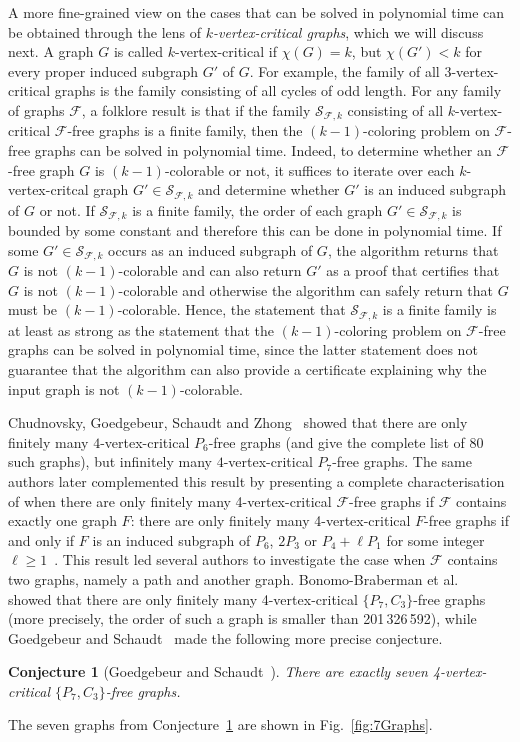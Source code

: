 \documentclass[11pt,a4paper]{article}
\newtheorem{conjecture}[theorem]{Conjecture}
\theoremstyle{definition}
\begin{document}
A more fine-grained view on the cases that can be solved in polynomial time can be obtained through the lens of \textit{$k$-vertex-critical graphs}, which we will discuss next. A graph $G$ is called $k$-vertex-critical if $\chi(G)=k$, but $\chi(G')<k$ for every proper induced subgraph $G'$ of $G$. For example, the family of all $3$-vertex-critical graphs is the family consisting of all cycles of odd length. For any family of graphs $\mathcal{F}$, a folklore result is that if the family $\mathcal{S}_{\mathcal{F},k}$ consisting of all $k$-vertex-critical $\mathcal{F}$-free graphs is a finite family, then the $(k-1)$-coloring problem on $\mathcal{F}$-free graphs can be solved in polynomial time. Indeed, to determine whether an $\mathcal{F}$-free graph $G$ is $(k-1)$-colorable or not, it suffices to iterate over each $k$-vertex-critcal graph $G' \in \mathcal{S}_{\mathcal{F},k}$ and determine whether $G'$ is an induced subgraph of $G$ or not. If $\mathcal{S}_{\mathcal{F},k}$ is a finite family, the order of each graph $G' \in \mathcal{S}_{\mathcal{F},k}$ is bounded by some constant and therefore this can be done in polynomial time. If some $G' \in \mathcal{S}_{\mathcal{F},k}$ occurs as an induced subgraph of $G$, the algorithm returns that $G$ is not $(k-1)$-colorable and can also return $G'$ as a proof that certifies that $G$ is not $(k-1)$-colorable and otherwise the algorithm can safely return that $G$ must be $(k-1)$-colorable. Hence, the statement that $\mathcal{S}_{\mathcal{F},k}$ is a finite family is at least as strong as the statement that the $(k-1)$-coloring problem on $\mathcal{F}$-free graphs can be solved in polynomial time, since the latter statement does not guarantee that the algorithm can also provide a certificate explaining why the input graph is not $(k-1)$-colorable.

Chudnovsky, Goedgebeur, Schaudt and Zhong~\cite{CGSZ20b} showed that there are only finitely many $4$-vertex-critical $P_6$-free graphs (and give the complete list of $80$ such graphs), but infinitely many $4$-vertex-critical $P_7$-free graphs. The same authors later complemented this result by presenting a complete characterisation of when there are only finitely many 4-vertex-critical $\mathcal{F}$-free graphs if $\mathcal{F}$ contains exactly one graph $F$: there are only finitely many 4-vertex-critical $F$-free graphs if and only if $F$ is an induced subgraph of $P_6$, $2P_3$ or $P_4+\ell P_1$ for some integer $\ell \geq 1$~\cite{CGSZ20a}. This result led several authors to investigate the case when $\mathcal{F}$ contains two graphs, namely a path and another graph. Bonomo-Braberman et al.~\cite{BEtAl21} showed that there are only finitely many 4-vertex-critical $\{P_7,C_3\}$-free graphs (more precisely, the order of such a graph is smaller than 201\,326\,592), while Goedgebeur and Schaudt~\cite{GS18} made the following more precise conjecture.
\begin{conjecture}[Goedgebeur and Schaudt~\cite{GS18}]
\label{conj:GS}
    There are exactly seven 4-vertex-critical $\{P_7,C_3\}$-free graphs.
\end{conjecture}
The seven graphs from Conjecture~\ref{conj:GS} are shown in Fig.~\ref{fig:7Graphs}.
\end{document}
